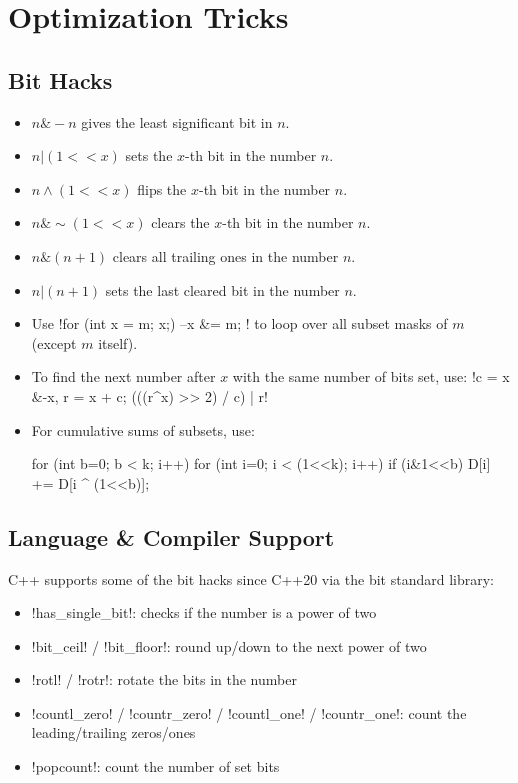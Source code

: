 \section{Optimization Tricks}

\subsection{Bit Hacks}
\begin{itemize}
      \item \( n \& -n \) gives the least significant bit in \( n \).
      \item \( n | (1 << x) \) sets the $x$-th bit in the number \( n \).
      \item \( n \land (1 << x) \) flips the $x$-th bit in the number \( n \).
      \item \( n \& \sim (1 << x) \) clears the $x$-th bit in the number \( n \).
      \item \( n \& (n + 1) \) clears all trailing ones in the number \( n \).
      \item \( n | (n + 1) \) sets the last cleared bit in the number \( n \).
      \item Use \inlinecode!for (int x = m; x;) { --x &= m; }! to loop over all subset
            masks of \( m \) (except \( m \) itself).
      \item To find the next number after \( x \) with the same number of bits set, use:
            \inlinecode!c = x &-x, r = x + c; (((r^x) >> 2) / c) | r!
      \item For cumulative sums of subsets, use:
            \begin{codesnippet}
for (int b=0; b < k; i++)
      for (int i=0; i < (1<<k); i++)
            if (i&1<<b) D[i] += D[i ^ (1<<b)];
            \end{codesnippet}
\end{itemize}

\subsection{Language \& Compiler Support}
C++ supports some of the bit hacks since C++20 via the bit standard library:
\begin{itemize}
      \item \inlinecode!has_single_bit!: checks if the number is a power of two
      \item \inlinecode!bit_ceil! / \inlinecode!bit_floor!: round up/down to the next power of two
      \item \inlinecode!rotl! / \inlinecode!rotr!: rotate the bits in the number
      \item \inlinecode!countl_zero! / \inlinecode!countr_zero! / \inlinecode!countl_one! / \inlinecode!countr_one!: count the leading/trailing zeros/ones
      \item \inlinecode!popcount!: count the number of set bits
\end{itemize}

